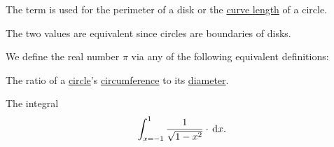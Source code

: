\begin{definition}\label{def:circumference}
  The term  is used for the perimeter of a disk or the \hyperref[def:parametric_curve_length]{curve length} of a circle.
\end{definition}
\begin{defproof}
  The two values are equivalent since circles are boundaries of disks.
\end{defproof}

\begin{definition}\label{def:pi}
  We define the real number \( \pi \) via any of the following equivalent definitions:
  \begin{thmenum}
     The ratio of a \hyperref[def:circle]{circle}'s \hyperref[def:circumference]{circumference} to its \hyperref[def:metric_space/diameter]{diameter}.

     The integral
    \begin{equation}\label{eq:def:pi/integral}
      \int_{x=-1}^1 \frac 1 { \sqrt{1 - x^2} } \cdot \dl x.
    \end{equation}
  \end{thmenum}
\end{definition}
